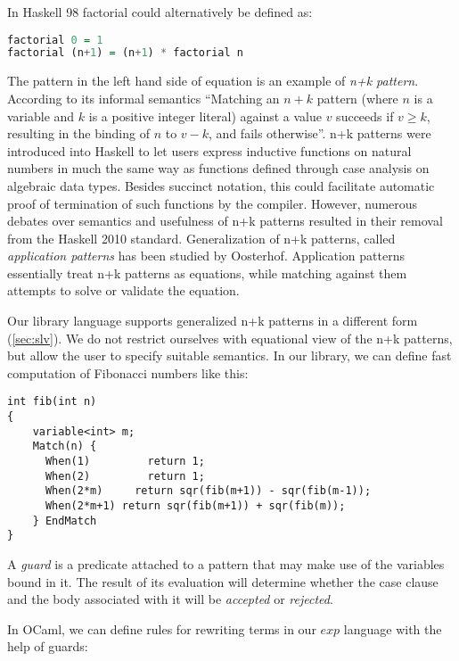 In Haskell 98\cite{Haskell98Book} factorial could alternatively be defined as:

\begin{lstlisting}[language=Haskell]
factorial 0 = 1
factorial (n+1) = (n+1) * factorial n
\end{lstlisting}

\noindent
The  pattern in the left hand side of equation is an example of 
\emph{n+k pattern}. According to its informal semantics ``Matching an $n+k$ 
pattern (where $n$ is a variable and $k$ is a positive integer literal) against 
a value $v$ succeeds if $v \ge k$, resulting in the binding of $n$ to $v-k$, and 
fails otherwise''\cite{haskell98}. n+k patterns were introduced into Haskell to 
let users express inductive functions on natural numbers in much the same way as 
functions defined through case analysis on algebraic data types. Besides 
succinct notation, this could facilitate automatic proof of 
termination of such functions by the compiler.
However, numerous debates over semantics and usefulness of n+k patterns
resulted in their removal from the Haskell 
2010 standard\cite{haskell2010}. Generalization of n+k patterns, called 
\emph{application patterns} has been studied by Oosterhof\cite{OosterhofThesis}. 
Application patterns essentially treat n+k patterns as equations, while matching 
against them attempts to solve or validate the equation.

Our library language supports generalized n+k patterns in a different form 
(\textsection\ref{sec:slv}). We do not restrict ourselves with equational view 
of the n+k patterns, but allow the user to specify suitable semantics.
In our library, we can define fast computation of Fibonacci numbers like this:

\begin{lstlisting}[keepspaces]
int fib(int n)
{
    variable<int> m;
    Match(n) {
      When(1)         return 1;     
      When(2)         return 1;
      When(2*m)     return sqr(fib(m+1)) - sqr(fib(m-1));
      When(2*m+1) return sqr(fib(m+1)) + sqr(fib(m));
    } EndMatch
}
\end{lstlisting}

\noindent
A \emph{guard} 
is a predicate attached to a pattern that may make use of the variables bound in 
it. The result of its evaluation will determine whether the case clause and the 
body associated with it will be \emph{accepted} or \emph{rejected}.

In OCaml, we can define rules for rewriting terms in 
our $exp$ language with the help of guards:

